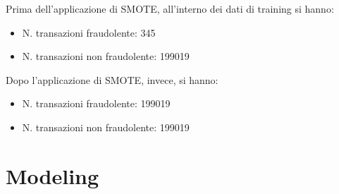 \documentclass[]{article}
\begin{document}
            Prima dell'applicazione di SMOTE, all'interno dei dati di training si hanno:
            \begin{itemize}
                \item N. transazioni fraudolente: 345
                \item N. transazioni non fraudolente: 199019
            \end{itemize}
            Dopo l'applicazione di SMOTE, invece, si hanno:
            \begin{itemize}
                \item N. transazioni fraudolente: 199019
                \item N. transazioni non fraudolente: 199019
            \end{itemize}
\section{Modeling}
\end{document}
